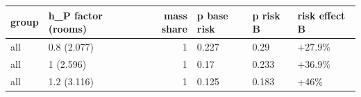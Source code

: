\begingroup\small
\setlength{\tabcolsep}{3pt}
\renewcommand{\arraystretch}{1.04}
\begin{tabularx}{\linewidth}{XXrXXX}
\toprule
group & h\_P factor (rooms) & mass share & p base risk & p risk B & risk effect B \\
\midrule
all & 0.8 (2.077) & 1 & 0.227 & 0.29 & +27.9\% \\
all & 1 (2.596) & 1 & 0.17 & 0.233 & +36.9\% \\
all & 1.2 (3.116) & 1 & 0.125 & 0.183 & +46\% \\
\bottomrule
\end{tabularx}
\endgroup
